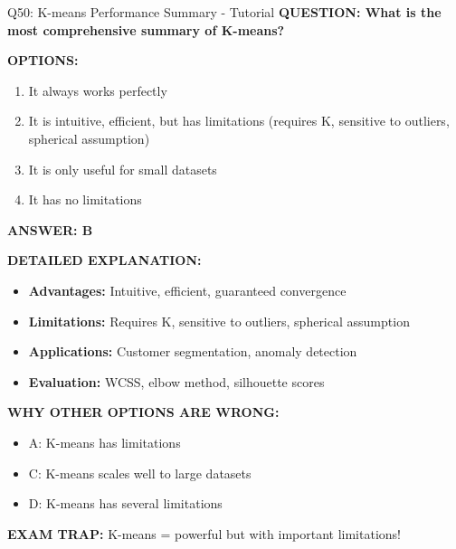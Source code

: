 \documentclass[8pt]{beamer}
\begin{document}
	\begin{frame}{Q50: K-means Performance Summary - Tutorial}
		\fontsize{6.5}{7.5}\selectfont
		\textbf{QUESTION: What is the most comprehensive summary of K-means?}
		
		\vspace{0.1cm}
		\textbf{OPTIONS:}
		\begin{enumerate}
			\item It always works perfectly
			\item It is intuitive, efficient, but has limitations (requires K, sensitive to outliers, spherical assumption)
			\item It is only useful for small datasets
			\item It has no limitations
		\end{enumerate}
		
		\vspace{0.1cm}
		\textcolor{myblue}{\textbf{ANSWER: B}}
		
		\vspace{0.1cm}
		\textbf{DETAILED EXPLANATION:}
		\begin{itemize}
			\item \textbf{Advantages:} Intuitive, efficient, guaranteed convergence
			\item \textbf{Limitations:} Requires K, sensitive to outliers, spherical assumption
			\item \textbf{Applications:} Customer segmentation, anomaly detection
			\item \textbf{Evaluation:} WCSS, elbow method, silhouette scores
		\end{itemize}
		
		\vspace{0.1cm}
		\textcolor{myred}{\textbf{WHY OTHER OPTIONS ARE WRONG:}}
		\begin{itemize}
			\item \textcolor{myred}{A:} K-means has limitations
			\item \textcolor{myred}{C:} K-means scales well to large datasets
			\item \textcolor{myred}{D:} K-means has several limitations
		\end{itemize}
		
		\textcolor{myred}{\textbf{EXAM TRAP:}} K-means = \textcolor{myblue}{powerful but with important limitations}!
	\end{frame}
	
	
\end{document}
